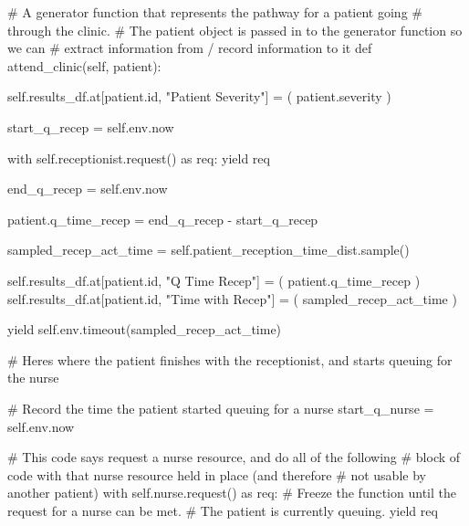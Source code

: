 \documentclass[
  letterpaper,
  DIV=11,
  numbers=noendperiod]{scrreprt}
\newenvironment{Shaded}{}{}
\newcommand{\BuiltInTok}[1]{\textcolor[rgb]{0.84,0.23,0.29}{#1}}
\newcommand{\CommentTok}[1]{\textcolor[rgb]{0.42,0.45,0.49}{#1}}
\newcommand{\ControlFlowTok}[1]{\textcolor[rgb]{0.84,0.23,0.29}{#1}}
\newcommand{\ImportTok}[1]{\textcolor[rgb]{0.01,0.18,0.38}{#1}}
\newcommand{\KeywordTok}[1]{\textcolor[rgb]{0.84,0.23,0.29}{#1}}
\newcommand{\NormalTok}[1]{\textcolor[rgb]{0.14,0.16,0.18}{#1}}
\newcommand{\OperatorTok}[1]{\textcolor[rgb]{0.14,0.16,0.18}{#1}}
\newcommand{\StringTok}[1]{\textcolor[rgb]{0.01,0.18,0.38}{#1}}
\newcommand{\VariableTok}[1]{\textcolor[rgb]{0.89,0.38,0.04}{#1}}
\begin{document}
\begin{tcolorbox}
\begin{Shaded}
\begin{Highlighting}[]
    \CommentTok{\# A generator function that represents the pathway for a patient going}
    \CommentTok{\# through the clinic.}
    \CommentTok{\# The patient object is passed in to the generator function so we can}
    \CommentTok{\# extract information from / record information to it}
    \KeywordTok{def}\NormalTok{ attend\_clinic(}\VariableTok{self}\NormalTok{, patient):}

        \VariableTok{self}\NormalTok{.results\_df.at[patient.}\BuiltInTok{id}\NormalTok{, }\StringTok{"Patient Severity"}\NormalTok{] }\OperatorTok{=}\NormalTok{ (}
\NormalTok{                 patient.severity}
\NormalTok{            )}

\NormalTok{        start\_q\_recep }\OperatorTok{=} \VariableTok{self}\NormalTok{.env.now}

        \ControlFlowTok{with} \VariableTok{self}\NormalTok{.receptionist.request() }\ImportTok{as}\NormalTok{ req:}
            \ControlFlowTok{yield}\NormalTok{ req}

\NormalTok{            end\_q\_recep }\OperatorTok{=} \VariableTok{self}\NormalTok{.env.now}

\NormalTok{            patient.q\_time\_recep }\OperatorTok{=}\NormalTok{ end\_q\_recep }\OperatorTok{{-}}\NormalTok{ start\_q\_recep}

\NormalTok{            sampled\_recep\_act\_time }\OperatorTok{=} \VariableTok{self}\NormalTok{.patient\_reception\_time\_dist.sample()}

            \VariableTok{self}\NormalTok{.results\_df.at[patient.}\BuiltInTok{id}\NormalTok{, }\StringTok{"Q Time Recep"}\NormalTok{] }\OperatorTok{=}\NormalTok{ (}
\NormalTok{                 patient.q\_time\_recep}
\NormalTok{            )}
            \VariableTok{self}\NormalTok{.results\_df.at[patient.}\BuiltInTok{id}\NormalTok{, }\StringTok{"Time with Recep"}\NormalTok{] }\OperatorTok{=}\NormalTok{ (}
\NormalTok{                 sampled\_recep\_act\_time}
\NormalTok{            )}

            \ControlFlowTok{yield} \VariableTok{self}\NormalTok{.env.timeout(sampled\_recep\_act\_time)}

    \CommentTok{\# Here\textquotesingle{}s where the patient finishes with the receptionist, and starts queuing for the nurse}


        \CommentTok{\# Record the time the patient started queuing for a nurse}
\NormalTok{        start\_q\_nurse }\OperatorTok{=} \VariableTok{self}\NormalTok{.env.now}

        \CommentTok{\# This code says request a nurse resource, and do all of the following}
        \CommentTok{\# block of code with that nurse resource held in place (and therefore}
        \CommentTok{\# not usable by another patient)}
        \ControlFlowTok{with} \VariableTok{self}\NormalTok{.nurse.request() }\ImportTok{as}\NormalTok{ req:}
            \CommentTok{\# Freeze the function until the request for a nurse can be met.}
            \CommentTok{\# The patient is currently queuing.}
            \ControlFlowTok{yield}\NormalTok{ req}


\end{Highlighting}
\end{Shaded}
\end{tcolorbox}
\end{document}
